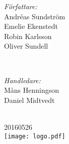 \begin{center}
\begin{minipage}{0.4\textwidth}
\begin{flushleft} \large
\emph{Författare:}\\
Andréas Sundström\footnotemark{} \\
Emelie Ekenstedt\footnotemark{} \\
Robin Karlsson\footnotemark{} \\
Oliver Sundell\footnotemark{}
\end{flushleft}
\end{minipage}
~
\begin{minipage}{0.4\textwidth}
\begin{flushright} \large
\emph{Handledare:} \\
Måns Henningson\\
Daniel Midtvedt\\
\end{flushright}
\end{minipage}\\[2cm]



{\Large 
2016\hspace{1pt}\raisebox{1pt}{-}05\hspace{1pt}\raisebox{1pt}{-}26%
}\\[1.5cm] 


\texttt{[image: logo.pdf]} %
 

\vfill %
\end{center}
\restoregeometry





